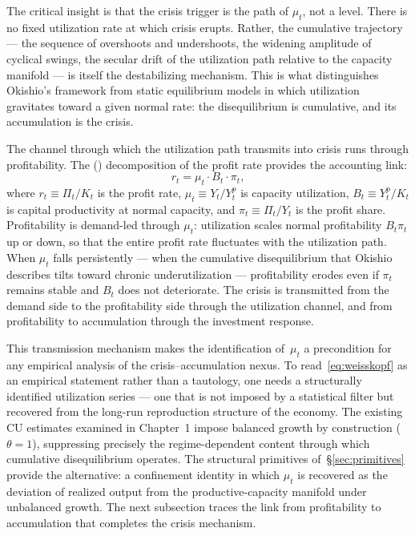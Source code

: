 \documentclass[12pt,letterpaper]{article}
\newcommand{\mut}{\mu_t}           %
\newcommand{\Yp}{Y^p_t}            %
\newcommand{\pit}{\pi_t}           %
\newcommand{\Bt}{B_t}              %
\begin{document}
The critical insight is that the crisis trigger is the path of $\mut$, not a
level. There is no fixed utilization rate at which crisis erupts. Rather, the
cumulative trajectory --- the sequence of overshoots and undershoots, the
widening amplitude of cyclical swings, the secular drift of the utilization
path relative to the capacity manifold --- is itself the destabilizing
mechanism. This is what distinguishes Okishio's framework from static
equilibrium models in which utilization gravitates toward a given normal rate:
the disequilibrium is cumulative, and its accumulation is the crisis.

The channel through which the utilization path transmits into crisis runs
through profitability. The \citeauthor{weisskopf1979}
(\citeyear{weisskopf1979}) decomposition of the profit rate provides the
accounting link:
\begin{equation}
  r_t = \mut \cdot \Bt \cdot \pit,
  \label{eq:weisskopf}
\end{equation}
where $r_t \equiv \Pi_t/K_t$ is the profit rate, $\mut \equiv Y_t/\Yp$ is
capacity utilization, $\Bt \equiv \Yp/K_t$ is capital productivity at normal
capacity, and $\pit \equiv \Pi_t/Y_t$ is the profit share.
Profitability is demand-led through $\mut$: utilization scales normal
profitability $\Bt\pit$ up or down, so that the entire profit rate fluctuates
with the utilization path. When $\mut$ falls persistently --- when the
cumulative disequilibrium that Okishio describes tilts toward chronic
underutilization --- profitability erodes even if $\pit$ remains stable and
$\Bt$ does not deteriorate. The crisis is transmitted from the demand side to
the profitability side through the utilization channel, and from profitability
to accumulation through the investment response.

This transmission mechanism makes the identification of~$\mut$ a precondition
for any empirical analysis of the crisis--accumulation nexus. To
read~\eqref{eq:weisskopf} as an empirical statement rather than a tautology,
one needs a structurally identified utilization series --- one that is not
imposed by a statistical filter but recovered from the long-run reproduction
structure of the economy. The existing CU estimates examined in Chapter~1
impose balanced growth by construction ($\theta = 1$), suppressing precisely
the regime-dependent content through which cumulative disequilibrium operates.
The structural primitives of~\S\ref{sec:primitives} provide the alternative: a
confinement identity in which $\mut$ is recovered as the deviation of realized
output from the productive-capacity manifold under unbalanced growth. The next
subsection traces the link from profitability to accumulation that completes
the crisis mechanism.
\end{document}

